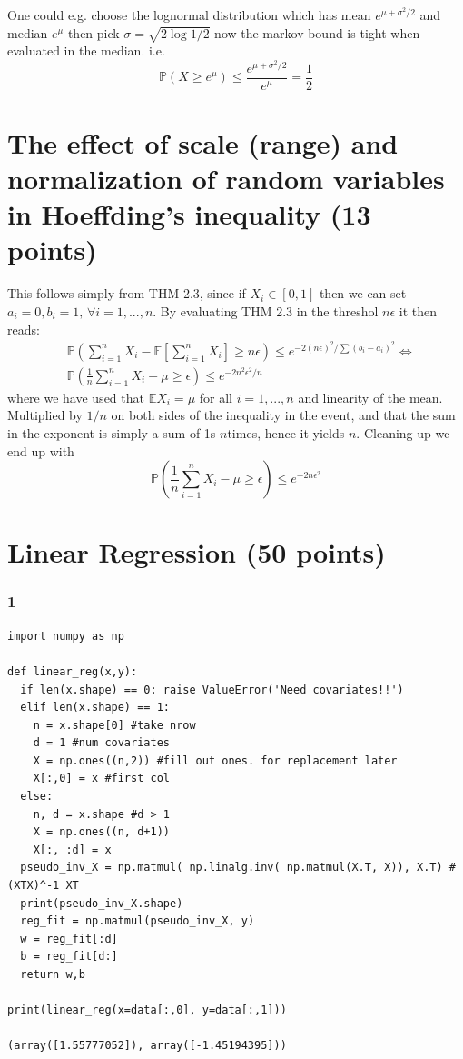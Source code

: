 \documentclass[a4paper,12pt]{article}
\begin{document}
One could e.g. choose the lognormal distribution which has mean $e^{\mu + \sigma^2/2}$ and median $e^\mu$
then pick $\sigma = \sqrt{2\log{1/2}}$ now the markov bound is tight when evaluated in the median.
i.e.
$$
\mathbb{P}\left( X  \geq  e^\mu \right) \leq \frac{e^{\mu + \sigma^2/2}}{e^\mu} = \frac{1}{2}
$$


\section{The effect of scale (range) and normalization of random variables in Hoeffding's inequality (13 points)}


This follows simply from THM 2.3, since if $X_i \in [0,1]$ then we can set $a_i = 0, b_i = 1,\, \forall i = 1,...,n$.
By evaluating THM 2.3 in the threshol $n\epsilon$ it then reads:
\begin{align}
&\mathbb{P}\left(  \sum_{i = 1}^nX_i - \mathbb{E}\left[ \sum_{i = 1}^nX_i \right] \geq n\epsilon \right) \leq e^{-2(n\epsilon)^2 / \sum (b_i - a_i)^2}  \Leftrightarrow \\
&\mathbb{P}\left(  \frac{1}{n}\sum_{i = 1}^nX_i - \mu \geq \epsilon \right) \leq e^{-2n^2\epsilon^2 / n}
\end{align}
where we have used that $\mathbb{E}X_i = \mu$ for all $i = 1,...,n$ and linearity of the mean. Multiplied by $1/n$ on both sides of the inequality in the event, and that the sum in the exponent is simply a sum of 1s $n$times, hence it yields $n$.
Cleaning up we end up with
$$
\mathbb{P}\left(  \frac{1}{n}\sum_{i = 1}^nX_i - \mu \geq \epsilon \right) \leq e^{-2n\epsilon^2}
$$






\section{Linear Regression (50 points)}

\subsubsection*{1}
\begin{lstlisting}
import numpy as np

def linear_reg(x,y):
  if len(x.shape) == 0: raise ValueError('Need covariates!!')
  elif len(x.shape) == 1:
    n = x.shape[0] #take nrow
    d = 1 #num covariates
    X = np.ones((n,2)) #fill out ones. for replacement later
    X[:,0] = x #first col 
  else:
    n, d = x.shape #d > 1
    X = np.ones((n, d+1))
    X[:, :d] = x
  pseudo_inv_X = np.matmul( np.linalg.inv( np.matmul(X.T, X)), X.T) #(XTX)^-1 XT
  print(pseudo_inv_X.shape)
  reg_fit = np.matmul(pseudo_inv_X, y)
  w = reg_fit[:d]
  b = reg_fit[d:]
  return w,b

print(linear_reg(x=data[:,0], y=data[:,1]))

(array([1.55777052]), array([-1.45194395]))
\end{lstlisting}
\end{document}
